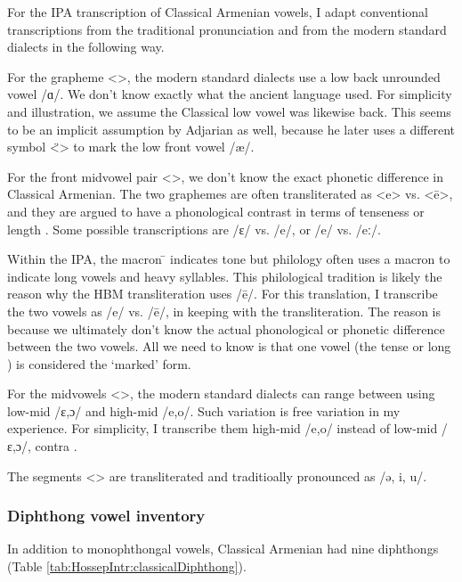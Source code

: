 For the IPA transcription of Classical Armenian vowels, I adapt conventional transcriptions from the traditional pronunciation and from the modern standard dialects in the following way. 


For the grapheme <>, the modern standard dialects use a low back unrounded vowel /ɑ/. We don't know exactly what the ancient language used. For simplicity and illustration, we assume the Classical low vowel was likewise back. This seems to be an implicit assumption by Adjarian as well, because he later uses a different symbol <̈> to mark the low front vowel /æ/. 

For the front midvowel pair <>, we don't know the exact phonetic difference in Classical Armenian. The two graphemes are often transliterated as <e> vs. <ē>, and they are argued to have a phonological contrast in terms of tenseness \citep[14]{Thomson-1989-IntroClassicalArmenian} or length \citep[6]{Godel-1975-IntroClassicalArmenian}. Some  possible transcriptions are /ɛ/ vs. /e/,  or /e/ vs. /eː/. 

Within the IPA, the macron   ̄  indicates tone but philology often uses a macron to indicate long vowels and heavy syllables. This philological tradition is likely the reason why the HBM transliteration uses /ē/. For this translation,   I transcribe the two vowels as /e/ vs. /ē/, in keeping with the transliteration. The reason is because we ultimately don't know the actual phonological or phonetic  difference between the two vowels. All we need to know is that one vowel (the tense or long ) is considered the `marked' form. 


For the midvowels <>, the modern standard dialects can range between using low-mid /ɛ,ɔ/ and high-mid /e,o/. Such variation is free variation in my experience. For simplicity, I transcribe them high-mid /e,o/ instead of low-mid /ɛ,ɔ/, contra \citet[1039]{Macak-2017-PhonoClassicalArmenian}. 

The segments <> are transliterated and traditioally pronounced as /ə, i, u/. 

\subsubsection{Diphthong vowel inventory}\label{sec:HossepIntro:phonotransc:Classical:Diphthong}
In addition to monophthongal vowels, Classical Armenian had nine diphthongs (Table \ref{tab:HossepIntr:classicalDiphthong}). 


